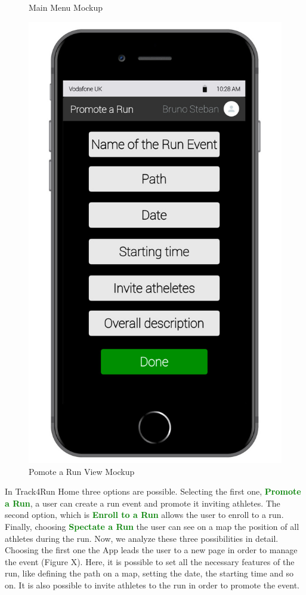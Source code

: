 \begin{enumerate}
\begin{figure}[H]
\begin{center}
\begin{minipage}[c]{.40\textwidth}
	\caption{Main Menu Mockup}
        \end{minipage}%
        \hspace{10mm}%
        \begin{minipage}[c]{.40\textwidth}
        \centering
          \includegraphics[height=14 cm]{Images/Mockups/Track4RunMockup6.jpg}
	\caption{Pomote a Run View Mockup}
        \end{minipage}
      \end{center}
\end{figure}
In Track4Run Home three options are possible. Selecting the first one, {\textcolor{Green}{\textbf{Promote a Run}}}, a user can create a run event and promote it inviting athletes. The second option, which is {\textcolor{Green}{\textbf{Enroll to a Run}}} allows the user to enroll to a run. Finally, choosing {\textcolor{Green}{\textbf{Spectate a Run}}} the user can see on a map the position of all athletes during the run. Now, we analyze these three possibilities in detail. Choosing the first one the App leads the user to a new page in order to manage the event (Figure X). Here, it is possible to set all the necessary features of the run, like defining the path on a map, setting the date, the starting time and so on. It is also possible to invite athletes to the run in order to promote the event.

\end{enumerate}
